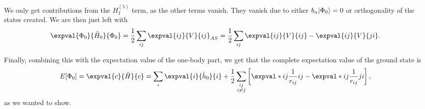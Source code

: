 We only get contributions from the $H_I^{(5)}$ term, as the other terms vanish.
They vanish due to either $b_\alpha \ket*{\Phi_0} = 0$ or orthogonality of the states created.
We are then just left with
\begin{equation}
    \expval{\Phi_0}{\hat{H}_0}{\Phi_0} = \frac{1}{2} \sum_{ij} \expval{ij}{V}{ij}_{AS} = \frac{1}{2} \sum_{ij} \expval{ij}{V}{ij} - \expval{ij}{V}{ji}.
\end{equation}

Finally, combining this with the expectation value of the one-body part, we get that the complete expectation value of the ground state is
\begin{equation}
    E[\Phi_0]
    = \expval{c}{\hat{H}}{c}
    = \sum_{i} \expval{i}{\hat{h}_0}{i} + \frac{1}{2} \sum_{\substack{ij \\ i \neq j}} \left[\expval*{ij}{\frac{1}{r_{ij}}}{ij} - \expval*{ij}{\frac{1}{r_{ij}}}{ji}\right],
\end{equation}
as we wanted to show.

